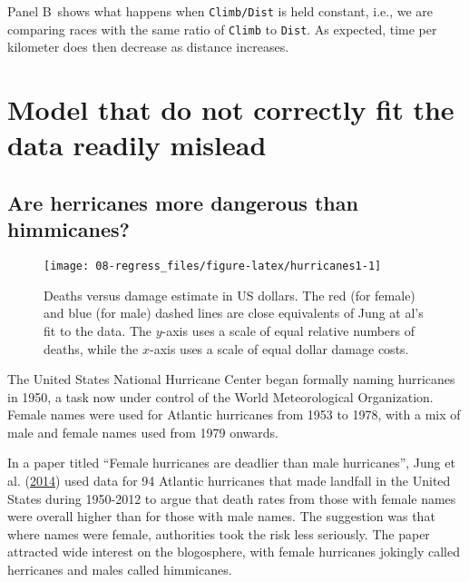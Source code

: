 \documentclass[
  10ptls,
  b5paper]{book}
\begin{document}
Panel B~shows what happens when \texttt{Climb/Dist} is held constant, i.e., we are comparing races with the same ratio of \texttt{Climb} to \texttt{Dist}. As expected, time per kilometer does then decrease as distance increases.

\hypertarget{model-that-do-not-correctly-fit-the-data-readily-mislead}{%
\section{Model that do not correctly fit the data readily mislead}\label{model-that-do-not-correctly-fit-the-data-readily-mislead}}

\hypertarget{are-herricanes-more-dangerous-than-himmicanes}{%
\subsection*{Are herricanes more dangerous than himmicanes?}\label{are-herricanes-more-dangerous-than-himmicanes}}

\begin{figure}[H]

{\centering \texttt{[image: 08-regress\_files/figure-latex/hurricanes1-1]} 

}

\caption{Deaths versus damage estimate in US dollars. The red (for female) 
and blue (for male) dashed lines are close equivalents of Jung at al's fit
to the data. The $y$-axis uses a scale of equal relative numbers of deaths, 
while the $x$-axis uses a scale of equal dollar damage costs.}\label{fig:hurricanes1}
\end{figure}

The United States National Hurricane Center began formally naming hurricanes in 1950, a task now under control of the World Meteorological Organization. Female names were used for Atlantic hurricanes from 1953 to 1978, with a mix of male and female names used from 1979 onwards.

In a paper titled ``Female hurricanes are deadlier than male hurricanes'', Jung et al. (\protect\hyperlink{ref-jung2014female}{2014}) used data for 94 Atlantic hurricanes that made landfall in the United States during 1950-2012 to argue that death rates from those with female names were overall higher than for those with male names. The suggestion was that where names were female, authorities took the risk less seriously. The paper attracted wide interest on the blogosphere, with female hurricanes jokingly called herricanes and males called himmicanes.
\end{document}
